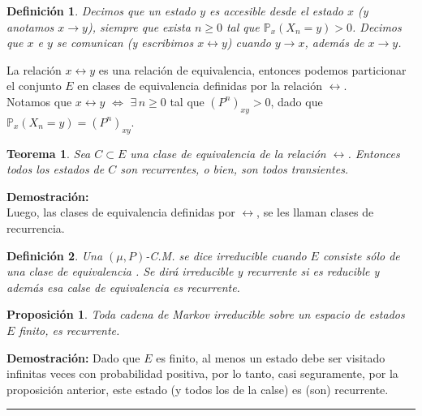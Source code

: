 \documentclass[a4paper]{article}
\newcommand{\prob}{\mathbb{P}}
\newtheorem{definicion}{Definición}
\newtheorem{teorema}{Teorema}
\newtheorem{prop}{Proposici\'on}
\numberwithin{equation}{subsection}
\begin{document}
\begin{definicion}
Decimos que un estado $y$ es accesible desde el estado $x$ (y anotamos $x\rightarrow y$), siempre que exista $n\geq 0$ tal que $\prob_x\left(X_n=y\right)>0$. Decimos que $x$ e $y$ se comunican (y escribimos $x\leftrightarrow y$) cuando $y\rightarrow x$,  además de $x\rightarrow y$. 
\end{definicion}

La relación $x\leftrightarrow y$ es una relación de equivalencia, entonces podemos particionar el conjunto $E$ en clases de equivalencia definidas por la relación $\leftrightarrow$.\\
Notamos que $x\leftrightarrow y$ $\Longleftrightarrow$ $\exists\,n\geq 0$ tal que $\left(P^n\right)_{xy}>0$, dado que $\prob_x\left(X_n=y\right)=\left(P^n\right)_{xy}$.  \\ \newline

\begin{teorema}
Sea $C\subset E$ una clase de equivalencia de la relación $\leftrightarrow$. Entonces todos los estados de $C$ son recurrentes, o bien, son todos transientes.
\end{teorema}

\textbf{Demostración: }\cite[págs. 26- Teo.4.5]{Pard}\\ \newline
Luego, las clases de equivalencia definidas por $\leftrightarrow$, se les llaman clases de recurrencia.

\begin{definicion}
Una $(\mu,P)$-C.M. se dice irreducible cuando $E$ consiste sólo de una clase de equivalencia . Se dirá irreducible y recurrente si es reducible y además esa calse de equivalencia es  recurrente.
\end{definicion}

\begin{prop}
Toda cadena de Markov irreducible sobre un espacio de estados $E$ finito, es recurrente.
\end{prop}

\textbf{Demostración: }Dado que $E$ es finito, al menos un estado debe ser visitado infinitas veces con probabilidad positiva, por lo tanto,  casi seguramente, por la proposición anterior, este estado (y todos los de la calse) es (son) recurrente.\\
\rule{0.7em}{0.7em}\\ \newline
\end{document}
